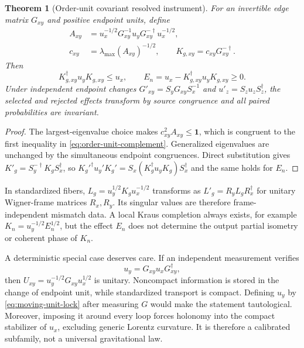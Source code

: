 \documentclass[11pt]{article}
\newtheorem{theorem}{Theorem}[section]
\theoremstyle{remark}
\newcommand{\id}{\mathbf 1}
\begin{document}
\begin{theorem}[Order-unit covariant resolved instrument]
\label{thm:order-unit-instrument}
For an invertible edge matrix $G_{xy}$ and positive endpoint units, define
\begin{align}
 A_{xy}&=u_x^{-1/2}G_{xy}^{-1}u_yG_{xy}^{-\dagger}u_x^{-1/2},\nonumber\\
 c_{xy}&=\lambda_{\max}(A_{xy})^{-1/2},\qquad
 K_{g,xy}=c_{xy}G_{xy}^{-\dagger}.
 \label{eq:covariant-normalization}
\end{align}
Then
\begin{equation}
 K_{g,xy}^\dagger u_yK_{g,xy}\leq u_x,
 \qquad E_n=u_x-K_{g,xy}^\dagger u_yK_{g,xy}\geq0.
 \label{eq:order-unit-complement}
\end{equation}
Under independent endpoint changes
$G'_{xy}=S_yG_{xy}S_x^{-1}$ and $u'_z=S_zu_zS_z^\dagger$, the selected and rejected
effects transform by source congruence and all paired probabilities are invariant.
\end{theorem}

\begin{proof}
The largest-eigenvalue choice makes $c_{xy}^2A_{xy}\leq\id$, which is congruent to the
first inequality in \eqref{eq:order-unit-complement}.  Generalized eigenvalues are
unchanged by the simultaneous endpoint congruences.  Direct substitution gives
$K'_g=S_y^{-\dagger}K_gS_x^\dagger$, so
$K_g'^\dagger u_y'K_g'=S_x(K_g^\dagger u_yK_g)S_x^\dagger$ and the same holds for
$E_n$.
\end{proof}

In standardized fibers, $L_g=u_y^{1/2}K_gu_x^{-1/2}$ transforms as
$L'_g=R_yL_gR_x^\dagger$ for unitary Wigner-frame matrices $R_x,R_y$.  Its singular
values are therefore frame-independent mismatch data.  A local Kraus completion always
exists, for example $K_n=u_y^{-1/2}E_n^{1/2}$, but the effect $E_n$ does not determine the
output partial isometry or coherent phase of $K_n$.

A deterministic special case deserves care.  If an independent measurement verifies
\begin{equation}
 u_y=G_{xy}u_xG_{xy}^\dagger,
 \label{eq:moving-unit-lock}
\end{equation}
then $U_{xy}=u_y^{-1/2}G_{xy}u_x^{1/2}$ is unitary.  Noncompact information is stored in
the change of endpoint unit, while standardized transport is compact.  Defining $u_y$ by
\eqref{eq:moving-unit-lock} after measuring $G$ would make the statement tautological.
Moreover, imposing it around every loop forces holonomy into the compact stabilizer of
$u_x$, excluding generic Lorentz curvature.  It is therefore a calibrated subfamily, not
a universal gravitational law.
\end{document}
